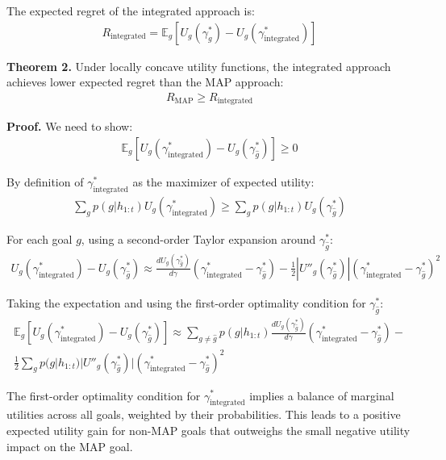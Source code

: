\documentclass[11pt]{article}
\begin{document}
The expected regret of the integrated approach is:
\begin{align}
R_{\text{integrated}} = \mathbb{E}_g\left[U_g(\gamma^*_g) - U_g(\gamma^*_{\text{integrated}})\right]
\end{align}

\textbf{Theorem 2.} Under locally concave utility functions, the integrated approach 
achieves lower expected regret than the MAP approach:
\begin{align}
R_{\text{MAP}} \geq R_{\text{integrated}}
\end{align}

\textbf{Proof.} We need to show:
\begin{align}
\mathbb{E}_g\left[U_g(\gamma^*_{\text{integrated}}) - U_g(\gamma^*_{\hat{g}})\right] \geq 0
\end{align}

By definition of $\gamma^*_{\text{integrated}}$ as the maximizer of expected utility:
\begin{align}
\sum_g p(g|h_{1:t})U_g(\gamma^*_{\text{integrated}}) \geq \sum_g p(g|h_{1:t})U_g(\gamma^*_{\hat{g}})
\end{align}

For each goal $g$, using a second-order Taylor expansion around $\gamma^*_{\hat{g}}$:
\begin{align}
U_g(\gamma^*_{\text{integrated}}) - U_g(\gamma^*_{\hat{g}}) \approx 
\frac{dU_g(\gamma^*_{\hat{g}})}{d\gamma}(\gamma^*_{\text{integrated}} - \gamma^*_{\hat{g}}) - 
\frac{1}{2}|U''_g(\gamma^*_{\hat{g}})|(\gamma^*_{\text{integrated}} - \gamma^*_{\hat{g}})^2
\end{align}

Taking the expectation and using the first-order optimality condition for $\gamma^*_{\hat{g}}$:
\begin{align}
\mathbb{E}_g\left[U_g(\gamma^*_{\text{integrated}}) - U_g(\gamma^*_{\hat{g}})\right] \approx 
\sum_{g \neq \hat{g}} p(g|h_{1:t})\frac{dU_g(\gamma^*_{\hat{g}})}{d\gamma}(\gamma^*_{\text{integrated}} - \gamma^*_{\hat{g}}) - \\
\frac{1}{2}\sum_g p(g|h_{1:t})|U''_g(\gamma^*_{\hat{g}})|(\gamma^*_{\text{integrated}} - \gamma^*_{\hat{g}})^2
\end{align}

The first-order optimality condition for $\gamma^*_{\text{integrated}}$ implies a balance of 
marginal utilities across all goals, weighted by their probabilities. This leads to a positive 
expected utility gain for non-MAP goals that outweighs the small negative utility impact on 
the MAP goal.
\end{document}
